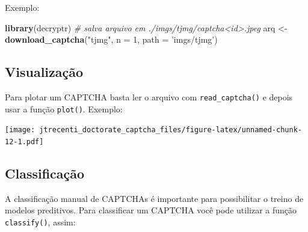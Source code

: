 \documentclass[12pt,]{report}
\newenvironment{Shaded}{\begin{snugshade}}{\end{snugshade}}
\newcommand{\KeywordTok}[1]{\textcolor[rgb]{0.13,0.29,0.53}{\textbf{#1}}}
\newcommand{\DataTypeTok}[1]{\textcolor[rgb]{0.13,0.29,0.53}{#1}}
\newcommand{\DecValTok}[1]{\textcolor[rgb]{0.00,0.00,0.81}{#1}}
\newcommand{\StringTok}[1]{\textcolor[rgb]{0.31,0.60,0.02}{#1}}
\newcommand{\CommentTok}[1]{\textcolor[rgb]{0.56,0.35,0.01}{\textit{#1}}}
\newcommand{\OperatorTok}[1]{\textcolor[rgb]{0.81,0.36,0.00}{\textbf{#1}}}
\newcommand{\NormalTok}[1]{#1}
\let\origfigure\figure
\let\endorigfigure\endfigure
\renewenvironment{figure}[1][2] {
    \expandafter\origfigure\expandafter[H]
} {
    \endorigfigure
}
\begin{document}
Exemplo:

\begin{Shaded}
\begin{Highlighting}[]
\KeywordTok{library}\NormalTok{(decryptr)}
\CommentTok{# salva arquivo em ./imgs/tjmg/captcha<id>.jpeg}
\NormalTok{arq <-}\StringTok{ }\KeywordTok{download_captcha}\NormalTok{(}\StringTok{"tjmg"}\NormalTok{, }\DataTypeTok{n =} \DecValTok{1}\NormalTok{, }\DataTypeTok{path =} \StringTok{'imgs/tjmg'}\NormalTok{) }
\end{Highlighting}
\end{Shaded}

\subsection{Visualização}\label{visualizacao}

Para plotar um CAPTCHA basta ler o arquivo com \texttt{read\_captcha()}
e depois usar a função \texttt{plot()}. Exemplo:

\begin{Shaded}
\end{Shaded}

\begin{figure}
\centering
\texttt{[image: jtrecenti\_doctorate\_captcha\_files/figure-latex/unnamed-chunk-12-1.pdf]}
\caption{\label{fig:unnamed-chunk-12}CAPTCHA do TJMG.}
\end{figure}

\subsection{Classificação}\label{classificacao}

A classificação manual de CAPTCHAs é importante para possibilitar o
treino de modelos preditivos. Para classificar um CAPTCHA você pode
utilizar a função \texttt{classify()}, assim:

\begin{Shaded}
\end{Shaded}
\end{document}
